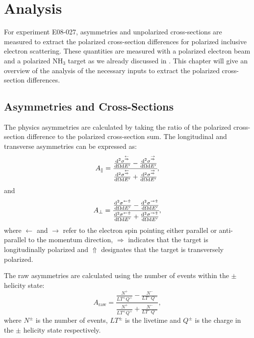 
\chapter{Analysis}
\label{C7}

For experiment E08-027, asymmetries and unpolarized cross-sections are measured to extract the polarized cross-section differences for polarized inclusive electron scattering. These quantities are measured with a polarized electron beam and a polarized NH${}_3$ target as we already discussed in . This chapter will give an overview of the analysis of the necessary inputs to extract the polarized cross-section differences.

\section{Asymmetries and Cross-Sections}
\label{C7S1}

The physics asymmetries are calculated by taking the ratio of the polarized cross-section difference to the polarized cross-section sum. The longitudinal and transverse asymmetries can be expressed as:
\begin{equation} \label{C7S1E1}
A_{\parallel}=\cfrac{\frac{\dd[2]{\sigma}^{\buildrel\leftarrow\over\Rightarrow}}{\dd{\Omega}\dd{E'}}-\frac{\dd[2]{\sigma}^{\buildrel\rightarrow\over\Rightarrow}}{\dd{\Omega}\dd{E'}}}{\frac{\dd[2]{\sigma}^{\buildrel\leftarrow\over\Rightarrow}}{\dd{\Omega}\dd{E'}}+\frac{\dd[2]{\sigma}^{\buildrel\rightarrow\over\Rightarrow}}{\dd{\Omega}\dd{E'}}},
\end{equation}
and
\begin{equation} \label{C7S1E2}
A_{\perp}=\cfrac{\frac{\dd[2]{\sigma}^{\leftarrow\Uparrow}}{\dd{\Omega}\dd{E'}}-\frac{\dd[2]{\sigma}^{\rightarrow\Uparrow}}{\dd{\Omega}\dd{E'}}}{\frac{\dd[2]{\sigma}^{\leftarrow\Uparrow}}{\dd{\Omega}\dd{E'}}+\frac{\dd[2]{\sigma}^{\rightarrow\Uparrow}}{\dd{\Omega}\dd{E'}}},
\end{equation}
where $\leftarrow$ and $\rightarrow$ refer to the electron spin pointing either parallel or anti-parallel to the momentum direction, $\Rightarrow$ indicates that the target is longitudinally polarized and $\Uparrow$ designates that the target is transversely polarized.

The raw asymmetries are calculated using the number of events within the $\pm$ helicity state:
\begin{equation} \label{C7S1E3}
A_{\mathrm{raw}}=\frac{\frac{N^+}{LT^+Q^+}-\frac{N^-}{LT^-Q^-}}{\frac{N^+}{LT^+Q^+}+\frac{N^-}{LT^-Q^-}},
\end{equation}
where $N^\pm$ is the number of events, $LT^{\pm}$ is the livetime and $Q^\pm$ is the charge in the $\pm$ helicity state respectively.

